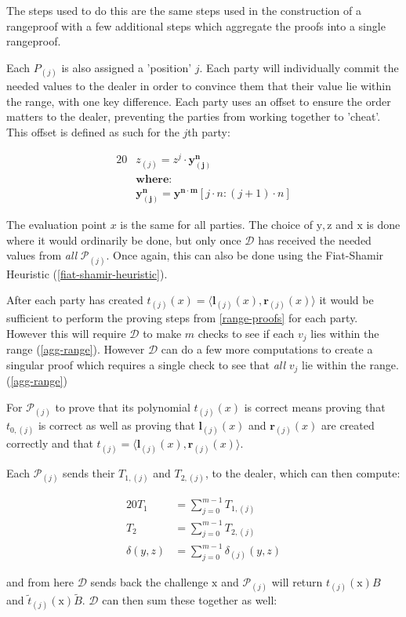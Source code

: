 \documentclass{article}
\newcommand{\eq}[1]{\begin{alignat*}{20}#1\end{alignat*}}
\renewcommand{\vec}[1]{\boldsymbol{#1}}
\newcommand{\ran}[1]{\mathrm{#1}}
\renewcommand{\P}{\mathcal{P}}
\newcommand{\D}{\mathcal{D}}
\newcommand{\dotp}[2]{\langle #1, #2 \rangle}
\newcommand{\tB}{\widetilde{B}}
\renewcommand{\tt}{\widetilde{t}}
\begin{document}
The steps used to do this are the same steps used in the construction
of a rangeproof with a few additional steps which aggregate the proofs
into a single rangeproof.

Each $P_{(j)}$ is
also assigned a 'position' $j$. Each party will individually commit
the needed values to the dealer in order to convince them that their
value lie within the range, with one key difference. Each party uses
an offset to ensure the order matters to the dealer, preventing the
parties from working together to 'cheat'. This offset is defined as
such for the $j$th party:

\eq{
	&z_{(j)}   = z^j \cdot \vec{y^n_{(j)}} \\
	&\textbf{where:}\\
	&\vec{y^n_{(j)}} = \vec{y^{n \cdot m}}[j \cdot n:(j+1) \cdot n]
}

The evaluation point $x$ is the same for all parties. The choice
of $\ran{y}, \ran{z}$ and $\ran{x}$ is done where it would ordinarily
be done, but only once $\D$ has received the needed values from \textit{all}
$\P_{(j)}$. Once again, this can also be done using the Fiat-Shamir
Heuristic (\ref{fiat-shamir-heuristic}).

After each party has created $t_{(j)}(x) =
\dotp{\vec{l}_{(j)}(x)}{\vec{r}_{(j)}(x)}$ it would be sufficient
to perform the proving steps from \ref{range-proofs} for each
party. However this will require $\D$ to make $m$ checks to see if each
$v_j$ lies within the range (\ref{agg-range}). However $\D$ can do a
few more computations to create a singular proof which requires a single
check to see that \textit{all} $v_j$ lie within the range. (\ref{agg-range})

For $\P_{(j)}$ to prove that its polynomial $t_{(j)}(x)$ is correct
means proving that $t_{0,(j)}$ is correct as well as proving that
$\vec{l}_{(j)}(x)$ and $\vec{r}_{(j)}(x)$ are created correctly and
that $t_{(j)} = \dotp{\vec{l}_{(j)}(x)}{\vec{r}_{(j)}(x)}$.

Each $\P_{(j)}$ sends their $T_{1,(j)}$ and $T_{2,(j)}$, to the dealer,
which can then compute:

\eq{
	T_1 &= \sum^{m-1}_{j = 0} T_{1,(j)}\\
	T_2 &= \sum^{m-1}_{j = 0} T_{2,(j)}\\
	\delta(y,z) &= \sum^{m-1}_{j = 0} \delta_{(j)}(y,z)
}

and from here $\D$ sends back the challenge
$\ran{x}$ and $\P_{(j)}$ will return $t_{(j)}(\ran{x})B$ and
$\tt_{(j)}(\ran{x})\tB$. $\D$ can then sum these
together as well:
\end{document}
